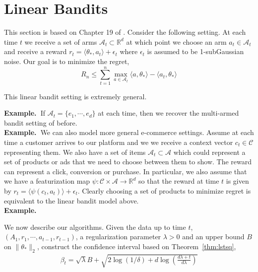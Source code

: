 \documentclass[11pt]{article}
\newcommand{\example}{\noindent\textbf{Example.\  }}
\newcommand{\mc}[1]{\mathcal{#1}}
\newcommand{\1}[1]{\mathbf{1}\left\{#1\right\}}
\begin{document}


\section{Linear Bandits}

This section is based on Chapter 19 of \cite{lattimore2020bandit}.
Consider the following setting. 
At each time $t$ we receive a set of arms $\mc{A}_t\subset \mathbb{R}^d$ at which point we choose an arm $a_t\in \mc{A}_t$ and receive a reward $r_t = \langle\theta_{\ast}, a_t\rangle + \epsilon_t$ where $\epsilon_t$ is assumed to be 1-subGaussian noise. 
Our goal is to minimize the regret, 
\[R_n \leq \sum_{t=1}^n \max_{a\in \mc{A}_t} \langle a, \theta_{\ast}\rangle - \langle a_t, \theta_{\ast}\rangle\]

This linear bandit setting is extremely general.

\example If $\mc{A}_t = \{e_1, \cdots, e_d\}$ at each time, then we recover the multi-armed bandit setting of before.\\

\example We can also model more general e-commerce settings. Assume at each time a customer arrives to our platform and we we receive a context vector $c_t\in \mc{C}$ representing them. We also have a set of items $\mc{A}_t\subset \mc{A}$ which could represent a set of products or ads that we need to choose between them to show. The reward can represent a click, conversion or purchase. In particular, we also assume that we have a featurization map $\psi:\mc{C}\times \mc{A} \rightarrow \mathbb{R}^d$ so that the reward at time $t$ is given by $r_t = \langle\psi(c_t, a_t)\rangle + \epsilon_t$. Clearly choosing a set of products to minimize regret is equivalent to the linear bandit model above.\\

\example 



We now describe our algorithms. Given the data up to time $t$, $(A_1, r_1, \cdots, a_{t-1}, r_{t-1})$, a regularization parameter $\lambda > 0$ and an upper bound $B$ on $\|\theta_{\ast}\|_2$, construct the confidence interval based on Theorem~\ref{thm:lstsq}, 
\begin{align*}
    \beta_t = \sqrt{\lambda} B + \sqrt{2\log(1/\delta) + d\log(\frac{d\lambda + t}{d\lambda})}     
\end{align*}
\end{document}
